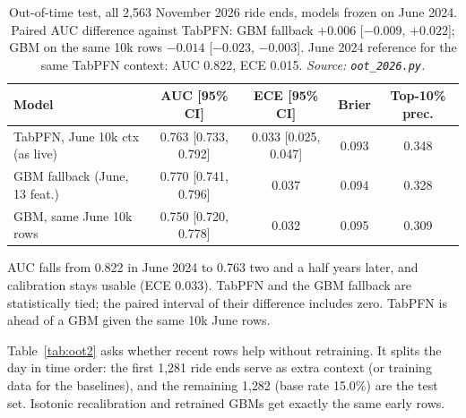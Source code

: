 \documentclass[11pt,a4paper]{article}
\begin{document}
\begin{table}[h]
\centering\small
\caption{Out-of-time test, all 2{,}563 November 2026 ride ends, models frozen on June 2024. Paired AUC difference against TabPFN: GBM fallback $+0.006$ [$-0.009$, $+0.022$]; GBM on the same 10k rows $-0.014$ [$-0.023$, $-0.003$]. June 2024 reference for the same TabPFN context: AUC 0.822, ECE 0.015. \emph{Source: \texttt{oot\_2026.py}.}}
\label{tab:oot1}
\begin{tabular}{@{}lcccc@{}}
\toprule
Model & AUC [95\% CI] & ECE [95\% CI] & Brier & Top-10\% prec. \\
\midrule
TabPFN, June 10k ctx (as live) & 0.763 [0.733, 0.792] & 0.033 [0.025, 0.047] & 0.093 & 0.348 \\
GBM fallback (June, 13 feat.) & 0.770 [0.741, 0.796] & 0.037 & 0.094 & 0.328 \\
GBM, same June 10k rows & 0.750 [0.720, 0.778] & 0.032 & 0.095 & 0.309 \\
\bottomrule
\end{tabular}
\end{table}

AUC falls from 0.822 in June 2024 to 0.763 two and a half years later, and calibration stays usable (ECE 0.033). TabPFN and the GBM fallback are statistically tied; the paired interval of their difference includes zero. TabPFN is ahead of a GBM given the same 10k June rows.

Table~\ref{tab:oot2} asks whether recent rows help without retraining. It splits the day in time order: the first 1{,}281 ride ends serve as extra context (or training data for the baselines), and the remaining 1{,}282 (base rate 15.0\%) are the test set. Isotonic recalibration and retrained GBMs get exactly the same early rows.
\end{document}
